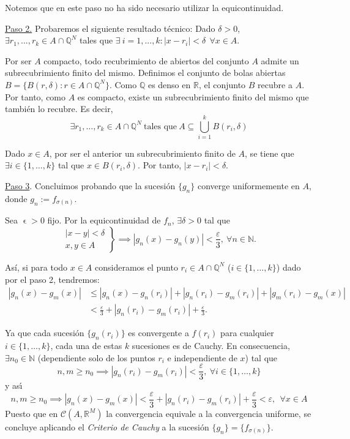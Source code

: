 \documentclass[11pt, a4paper]{article}
\makeatletter
\newif\IfInSansMode
\let\oldsf\sffamily
\renewcommand*{\sffamily}{\oldsf\mathversion{sans}\InSansModetrue}
\let\oldnorm\normalfont
\renewcommand*{\normalfont}{\oldnorm\InSansModefalse\mathversion{normal}}
\let\epsilon\upvarepsilon
\renewenvironment{proof}[1][\proofname] {\par\pushQED{\qed}\normalfont\topsep6\p@\@plus6\p@\relax\trivlist\item[\hskip\labelsep\itshape\sffamily#1\@addpunct{.}]\ignorespaces}{\popQED\endtrivlist\@endpefalse}
\theoremstyle{theorem-style}
\theoremstyle{definition-style}
\theoremstyle{remark-style}
\theoremstyle{example-style}
\makeatother
\begin{document}
\begin{proof}
    Notemos que en este paso no ha sido necesario utilizar la equicontinuidad.

    \underline{Paso 2.} Probaremos el siguiente resultado técnico: Dado $\delta>0$, $\exists r_1,...,r_k \in A \cap \mathbb Q^N$ tales que $\exists \ i=1,...,k : |x-r_i| < \delta \ \ \forall x \in A$.

    Por ser $A$ compacto, todo recubrimiento de abiertos del conjunto $A$ admite un subrecubrimiento finito del mismo. Definimos el conjunto de bolas abiertas $B=\{B(r,\delta) : r \in A\cap \mathbb Q^N \}$. Como $\mathbb{Q}$ es denso en $\mathbb{R}$, el conjunto $B$ recubre a $A$. Por tanto, como $A$ es compacto, existe un subrecubrimiento finito del mismo que también lo recubre. Es decir, $$\exists r_1,\dots, r_k \in A\cap \mathbb Q^N \ \text{tales que} \ A \subseteq \bigcup_{i=1}^k B(r_i,\delta)$$
    
    Dado $x \in A$, por ser el anterior un subrecubrimiento finito de $A$, se tiene que\\ $\exists i \in \{1,\dots,k\}$ tal que $x \in B(r_i,\delta)$. Por tanto, $|x-r_i| <\delta$.

    \underline{Paso 3}. Concluimos probando que la sucesión $\{g_n\}$ converge uniformemente en $A$, donde $g_n := f_{\sigma(n)}$.

    Sea $\epsilon>0$ fijo. Por la equicontinuidad de $f_n$, 
    $\exists\delta>0$ tal que
    \[
      \left.
        \begin{array}{c}
          |x-y| <\delta
          \\
          x,y\in A
        \end{array}
      \right\}
      \implies |g_n(x)-g_n(y)|<\frac{\varepsilon}{3} , \ \forall n\in\mathbb N.
    \]

    Así, si para todo $x\in A$ consideramos el punto  $r_i\in A\cap \mathbb Q^N$ ($i \in \{1,\dots,k\}$) dado por el paso 2, tendremos:
    \[
      \begin{aligned}
        |g_n(x)-g_m(x)| &\leq |g_n(x)-g_n(r_i)| + |g_n(r_i)-g_m(r_i)|+|g_m(r_i)-g_m(x)|
        \\
        &<\frac{\varepsilon}{3} +|g_n(r_i)-g_m(r_i)| 
        + \frac{\varepsilon}{3} .
      \end{aligned}
    \]



    Ya que cada sucesi\'on $\{ g_n(r_i)\}$ es convergente a $f(r_i)$ para cualquier $i\in \{ 1,\dots ,k\}$, cada una de estas $k$ sucesiones  es de Cauchy. En consecuencia, $\exists n_0\in\mathbb N$ ({dependiente solo de los puntos $r_i$ e independiente de $x$}) tal que
    \[
      n,m\geq n_0 \implies |g_n(r_i)-g_m(r_i)| <\frac{\varepsilon}{3} , \ \forall i\in \{ 1,\dots ,k\}
    \]
    y as\'{\i}
    \[
      n,m\geq n_0 \implies |g_n(x)-g_m(x)| <\frac{\varepsilon}{3} +|g_n(r_i)-g_m(r_i)| 
      + \frac{\varepsilon}{3} <\varepsilon , \ \ \forall x\in A
    \]
    Puesto que en $\mathcal{C}(A,\mathbb R^M )$ la convergencia equivale a la convergencia uniforme, se concluye aplicando el \textit{Criterio de Cauchy} a la sucesión $\{g_n\} = \{f_{\sigma(n)}\}$.
  \end{proof}
\end{document}
